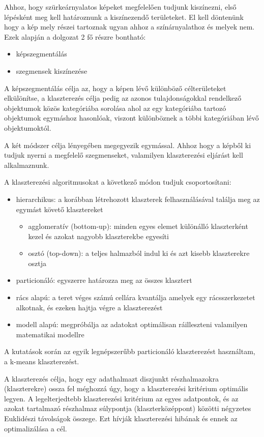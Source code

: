
Ahhoz, hogy szürkeárnyalatos képeket megfelelően tudjunk kiszínezni, első lépésként meg kell határoznunk a kiszínezendő területeket. El kell döntenünk hogy a kép mely részei tartoznak ugyan ahhoz a színárnyalathoz és melyek nem. Ezek alapján a dolgozat 2 fő részre bontható:
\begin{itemize}
\item képszegmentálás
\item szegmensek kiszínezése
\end{itemize}

A képszegmentálás célja az, hogy a képen lévő különböző célterületeket elkülönítse, a klaszterezés célja pedig az azonos tulajdonságokkal rendelkező objektumok közös kategóriába sorolása ahol az egy kategóriába tartozó objektumok egymáshoz hasonlóak, viszont különböznek a többi kategóriában lévő objektumoktól.

A két módszer célja lényegében megegyezik egymással. Ahhoz hogy a képből ki tudjuk nyerni a megfelelő szegmenseket, valamilyen klaszterezési eljárást kell alkalmaznunk.

A klaszterezési algoritmusokat a következő módon tudjuk csoportosítani\cite{clustering}:
\begin{itemize}
\item hierarchikus: a korábban létrehozott klaszterek felhasználásával találja meg az egymást követő klasztereket
    \begin{itemize}
    \item agglomeratív (bottom-up): minden egyes elemet különálló klaszterként kezel és azokat nagyobb klaszterekbe egyesíti
    \item osztó (top-down): a teljes halmazból indul ki és azt kisebb klaszterekre osztja
    \end{itemize}
\item particionáló: egyszerre határozza meg az összes klasztert
\item rács alapú: a teret véges számú cellára kvantálja amelyek egy rácsszerkezetet alkotnak, és ezeken hajtja végre a klaszterezést
\item modell alapú: megpróbálja az adatokat optimálisan ráilleszteni valamilyen matematikai modellre
\end{itemize}

A kutatások során az egyik legnépszerűbb particionáló klaszterezést használtam, a k-means klaszterezést.

A klaszterezés célja, hogy egy adathalmazt diszjunkt részhalmazokra (klaszterekre) ossza fel méghozzá úgy, hogy a klaszterezési kritérium optimális legyen. A legelterjedtebb klaszterezési kritérium az egyes adatpontok, és az azokat tartalmazó részhalmaz súlypontja (klaszterközéppont) közötti négyzetes Euklidészi távolságok összege. Ezt hívják klaszterezési hibának és ennek az optimalizálása a cél. \cite{kmeans}

